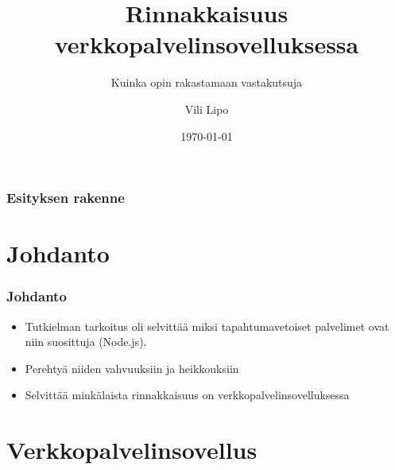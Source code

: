 \documentclass{beamer}
\title{Rinnakkaisuus verkkopalvelinsovelluksessa}
\subtitle{Kuinka opin rakastamaan vastakutsuja}
\author{Vili Lipo}
\institute{Helsingin Yliopisto}
\date{\today}
\begin{document}
\begin{frame}
\titlepage
\end{frame}
\begin{frame}
\frametitle{Esityksen rakenne}
\tableofcontents
\end{frame}
\section{Johdanto}
\begin{frame}
\frametitle{Johdanto}
 \begin{itemize}
 \item Tutkielman tarkoitus oli selvittää miksi tapahtumavetoiset palvelimet
 ovat niin suosittuja (Node.js).
 \item Perehtyä niiden vahvuuksiin ja heikkouksiin
 \item Selvittää minkälaista rinnakkaisuus on verkkopalvelinsovelluksessa
 \end{itemize}
\end{frame}
\section{Verkkopalvelinsovellus}
\end{document}
